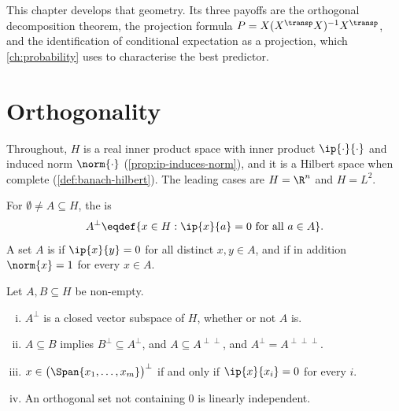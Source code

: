 This chapter develops that geometry. Its three payoffs are the orthogonal
decomposition theorem, the projection formula
$P=X(X^{\transp}X)^{-1}X^{\transp}$, and the identification of conditional
expectation as a projection, which \autoref{ch:probability} uses to characterise
the best predictor.

\section{Orthogonality}\label{sec:proj-orthogonality}

Throughout, $H$ is a real inner product space with inner product $\ip{\cdot}{\cdot}$
and induced norm $\norm{\cdot}$ (\autoref{prop:ip-induces-norm}), and it is a
Hilbert space when complete (\autoref{def:banach-hilbert}). The leading cases are
$H=\R^n$ and $H=L^2$.

\begin{definition}\label{def:orthogonal-complement}
	For $\emptyset\neq A\subseteq H$, the  is
	\[
		A^{\perp}\eqdef\{x\in H : \ip{x}{a}=0\ \text{for all }a\in A\} .
	\]
	A set $A$ is  if $\ip{x}{y}=0$ for all
	distinct $x,y\in A$, and  if in addition
	$\norm{x}=1$ for every $x\in A$.
\end{definition}

\begin{proposition}\label{prop:orthogonal-complement}
	Let $A,B\subseteq H$ be non-empty.
	\begin{enumerate}[(i)]
		\item $A^{\perp}$ is a closed vector subspace of $H$, whether or not $A$ is.
		\item $A\subseteq B$ implies $B^{\perp}\subseteq A^{\perp}$, and
		      $A\subseteq A^{\perp\perp}$, and $A^{\perp}=A^{\perp\perp\perp}$.
		\item $x\in\bigl(\Span\{x_1,\dots,x_m\}\bigr)^{\perp}$ if and only if
		      $\ip{x}{x_i}=0$ for every $i$.
		\item An orthogonal set not containing $0$ is linearly independent.
	\end{enumerate}
\end{proposition}

